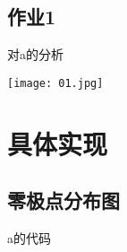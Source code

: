 \documentclass{zjureport}
\begin{document}
  \subsection{作业1}
    \begin{clause}
	\item 对a的分析
      \begin{center}
        \texttt{[image: 01.jpg]}
      \end{center}
    \end{clause}

\section{具体实现}
  \subsection{零极点分布图}
    \begin{clause}
	\item a的代码
      
    \end{clause}
\end{document}
